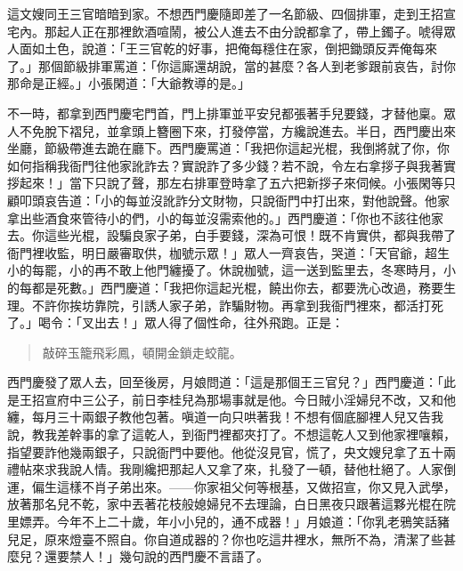 這文嫂同王三官暗暗到家。不想西門慶隨即差了一名節級、四個排軍，走到王招宣宅內。那起人正在那裡飲酒喧鬧，被公人進去不由分說都拿了，帶上鐲子。唬得眾人面如土色，說道：「王三官乾的好事，把俺每穩住在家，倒把鋤頭反弄俺每來了。」那個節級排軍罵道：「你這廝還胡說，當的甚麼？各人到老爹跟前哀告，討你那命是正經。」小張閑道：「大爺教導的是。」

不一時，都拿到西門慶宅門首，門上排軍並平安兒都張著手兒要錢，才替他稟。眾人不免脫下褶兒，並拿頭上簪圈下來，打發停當，方纔說進去。半日，西門慶出來坐廳，節級帶進去跪在廳下。西門慶罵道：「我把你這起光棍，我倒將就了你，你如何指稱我衙門往他家訛詐去？實說詐了多少錢？若不說，令左右拿拶子與我著實拶起來！」當下只說了聲，那左右排軍登時拿了五六把新拶子來伺候。小張閑等只顧叩頭哀告道：「小的每並沒訛詐分文財物，只說衙門中打出來，對他說聲。他家拿出些酒食來管待小的們，小的每並沒需索他的。」西門慶道：「你也不該往他家去。你這些光棍，設騙良家子弟，白手要錢，深為可恨！既不肯實供，都與我帶了衙門裡收監，明日嚴審取供，枷號示眾！」眾人一齊哀告，哭道：「天官爺，超生小的每罷，小的再不敢上他門纏擾了。休說枷號，這一送到監里去，冬寒時月，小的每都是死數。」西門慶道：「我把你這起光棍，饒出你去，都要洗心改過，務要生理。不許你挨坊靠院，引誘人家子弟，詐騙財物。再拿到我衙門裡來，都活打死了。」喝令：「叉出去！」眾人得了個性命，往外飛跑。正是：
\begin{quote}
敲碎玉籠飛彩鳳，頓開金鎖走蛟龍。
\end{quote}

西門慶發了眾人去，回至後房，月娘問道：「這是那個王三官兒？」西門慶道：「此是王招宣府中三公子，前日李桂兒為那場事就是他。今日賊小淫婦兒不改，又和他纏，每月三十兩銀子教他包著。嗔道一向只哄著我！不想有個底腳裡人兒又告我說，教我差幹事的拿了這乾人，到衙門裡都夾打了。不想這乾人又到他家裡嚷賴，指望要詐他幾兩銀子，只說衙門中要他。他從沒見官，慌了，央文嫂兒拿了五十兩禮帖來求我說人情。我剛纔把那起人又拿了來，扎發了一頓，替他杜絕了。人家倒運，偏生這樣不肖子弟出來。——你家祖父何等根基，又做招宣，你又見入武學，放著那名兒不乾，家中丟著花枝般媳婦兒不去理論，白日黑夜只跟著這夥光棍在院里嫖弄。今年不上二十歲，年小小兒的，通不成器！」月娘道：「你乳老鴉笑話豬兒足，原來燈臺不照自。你自道成器的？你也吃這井裡水，無所不為，清潔了些甚麼兒？還要禁人！」幾句說的西門慶不言語了。

